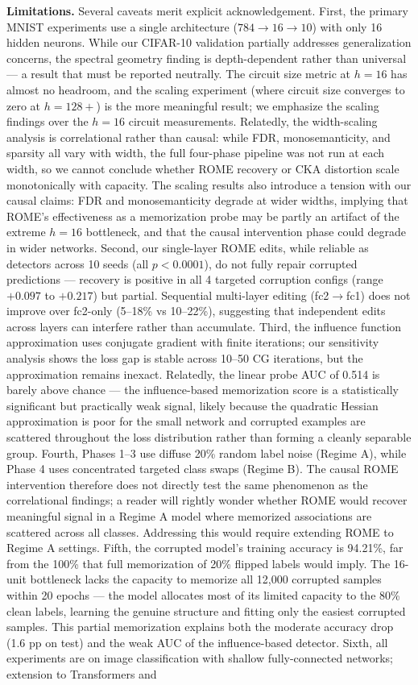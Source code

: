 \documentclass{article}
\begin{document}
\textbf{Limitations.} Several caveats merit explicit acknowledgement. First, the primary MNIST experiments use a single architecture ($784\to16\to10$) with only 16 hidden neurons. While our CIFAR-10 validation partially addresses generalization concerns, the spectral geometry finding is depth-dependent rather than universal — a result that must be reported neutrally. The circuit size metric at $h=16$ has almost no headroom, and the scaling experiment (where circuit size converges to zero at $h=128+$) is the more meaningful result; we emphasize the scaling findings over the $h=16$ circuit measurements. Relatedly, the width-scaling analysis is correlational rather than causal: while FDR, monosemanticity, and sparsity all vary with width, the full four-phase pipeline was not run at each width, so we cannot conclude whether ROME recovery or CKA distortion scale monotonically with capacity. The scaling results also introduce a tension with our causal claims: FDR and monosemanticity degrade at wider widths, implying that ROME's effectiveness as a memorization probe may be partly an artifact of the extreme $h=16$ bottleneck, and that the causal intervention phase could degrade in wider networks. Second, our single-layer ROME edits, while reliable as detectors across 10 seeds (all $p<0.0001$), do not fully repair corrupted predictions — recovery is positive in all 4 targeted corruption configs (range $+0.097$ to $+0.217$) but partial. Sequential multi-layer editing (fc2$\to$fc1) does not improve over fc2-only (5--18\% vs 10--22\%), suggesting that independent edits across layers can interfere rather than accumulate. Third, the influence function approximation uses conjugate gradient with finite iterations; our sensitivity analysis shows the loss gap is stable across 10--50 CG iterations, but the approximation remains inexact. Relatedly, the linear probe AUC of 0.514 is barely above chance — the influence-based memorization score is a statistically significant but practically weak signal, likely because the quadratic Hessian approximation is poor for the small network and corrupted examples are scattered throughout the loss distribution rather than forming a cleanly separable group. Fourth, Phases 1--3 use diffuse 20\% random label noise (Regime A), while Phase 4 uses concentrated targeted class swaps (Regime B). The causal ROME intervention therefore does not directly test the same phenomenon as the correlational findings; a reader will rightly wonder whether ROME would recover meaningful signal in a Regime A model where memorized associations are scattered across all classes. Addressing this would require extending ROME to Regime A settings. Fifth, the corrupted model's training accuracy is 94.21\%, far from the 100\% that full memorization of 20\% flipped labels would imply. The 16-unit bottleneck lacks the capacity to memorize all 12,000 corrupted samples within 20 epochs — the model allocates most of its limited capacity to the 80\% clean labels, learning the genuine structure and fitting only the easiest corrupted samples. This partial memorization explains both the moderate accuracy drop (1.6 pp on test) and the weak AUC of the influence-based detector. Sixth, all experiments are on image classification with shallow fully-connected networks; extension to Transformers and 
\end{document}
